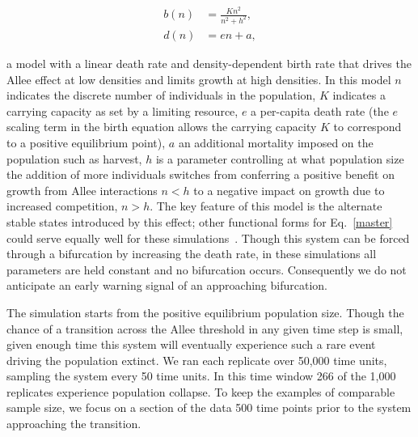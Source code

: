 \documentclass[authoryear,review,12pt]{elsarticle}
\begin{document}
\begin{align}
    b(n) &= \frac{ K n^2}{n^2 + h^2}, \label{master} \\
    d(n) &= e n + a, 
\end{align}




a model with a linear death rate and density-dependent birth rate
that drives the Allee effect at low densities and limits growth at high
densities.  In this model $n$ indicates the discrete number of individuals
in the population, $K$ indicates a carrying capacity as set by a limiting
resource, $e$ a per-capita death rate (the $e$ scaling term in the birth
equation allows the carrying capacity $K$ to correspond to a positive
equilibrium point), $a$ an additional mortality imposed on the population
such as harvest, $h$ is a parameter controlling at what population size
the addition of more individuals switches from conferring a positive
benefit on growth from Allee interactions $n < h$ to a negative impact
on growth due to increased competition, $n > h$.  The key feature of
this model is the alternate stable states introduced by this effect;
other functional forms for Eq.~\eqref{master} could serve equally
well for these simulations~\citep[see \emph{e.g.}][]{Scheffer2001}.
Though this system can be forced through a bifurcation by increasing
the death rate, in these simulations all parameters are held constant
and no bifurcation occurs.  Consequently we do not anticipate an early
warning signal of an approaching bifurcation.

The simulation starts from the positive equilibrium population size.
Though the chance of a transition across the Allee threshold in any
given time step is small, given enough time this system will eventually
experience such a rare event driving the population extinct.  We ran
each replicate over 50,000 time units, sampling the system every 50
time units.  In this time window 266 of the 1,000 replicates experience
population collapse.  To keep the examples of comparable sample size,
we focus on a section of the data 500 time points prior to the system
approaching the transition.
\end{document}

